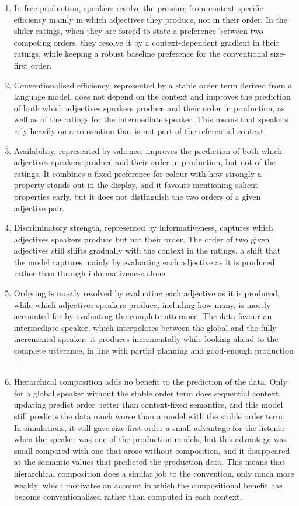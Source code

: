 \documentclass[10pt,a4paper,fleqn]{article}
\begin{document}
\begin{enumerate}
\item In free production, speakers resolve the pressure from context-specific efficiency mainly in which adjectives they produce, not in their order.
In the slider ratings, when they are forced to state a preference between two competing orders, they resolve it by a context-dependent gradient in their ratings, while keeping a robust baseline preference for the conventional size-first order.
\item Conventionalised efficiency, represented by a stable order term derived from a language model, does not depend on the context and improves the prediction of both which adjectives speakers produce and their order in production, as well as of the ratings for the intermediate speaker.
This means that speakers rely heavily on a convention that is not part of the referential context.
\item Availability, represented by salience, improves the prediction of both which adjectives speakers produce and their order in production, but not of the ratings.
It combines a fixed preference for colour with how strongly a property stands out in the display, and it favours mentioning salient properties early, but it does not distinguish the two orders of a given adjective pair.
\item Discriminatory strength, represented by informativeness, captures which adjectives speakers produce but not their order.
The order of two given adjectives still shifts gradually with the context in the ratings, a shift that the model captures mainly by evaluating each adjective as it is produced rather than through informativeness alone.
\item Ordering is mostly resolved by evaluating each adjective as it is produced, while which adjectives speakers produce, including how many, is mostly accounted for by evaluating the complete utterance.
The data favour an intermediate speaker, which interpolates between the global and the fully incremental speaker: it produces incrementally while looking ahead to the complete utterance, in line with partial planning and good-enough production \citep{ferreira2002incremental,ferreira2002goodenough}.
\item Hierarchical composition adds no benefit to the prediction of the data.
Only for a global speaker without the stable order term does sequential context updating predict order better than context-fixed semantics, and this model still predicts the data much worse than a model with the stable order term.
In simulations, it still gave size-first order a small advantage for the listener when the speaker was one of the production models, but this advantage was small compared with one that arose without composition, and it disappeared at the semantic values that predicted the production data.
This means that hierarchical composition does a similar job to the convention, only much more weakly, which motivates an account in which the compositional benefit has become conventionalised rather than computed in each context.
\end{enumerate}
\end{document}
